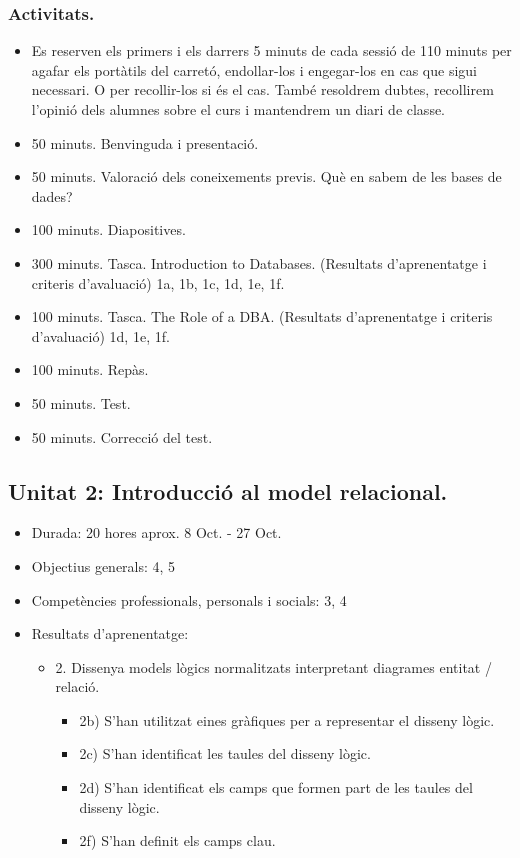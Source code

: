 \documentclass[catalan, a4paper, 12pt, titlepage]{article}
\begin{document}
  \subsubsection{Activitats.}

  \begin{itemize}
          \item Es reserven els primers i els darrers 5 minuts de cada sessió de 110 minuts per agafar els portàtils del carretó, endollar-los i engegar-los en cas que sigui necessari. O per recollir-los si és el cas. També resoldrem dubtes, recollirem l'opinió dels alumnes sobre el curs i mantendrem un diari de classe.
	  \item 50 minuts. Benvinguda i presentació.
	  \item 50 minuts. Valoració dels coneixements previs. Què en sabem de les bases de dades?
	  \item 100 minuts. Diapositives.
	  \item 300 minuts. Tasca. Introduction to Databases.
		  (\faGraduationCap Resultats d'aprenentatge i criteris d'avaluació) 1a, 1b, 1c, 1d, 1e, 1f.
	  \item 100 minuts. Tasca. The Role of a DBA.
		  (\faGraduationCap Resultats d'aprenentatge i criteris d'avaluació) 1d, 1e, 1f.
	  \item 100 minuts. Repàs.
	  \item 50 minuts. Test.
	  \item 50 minuts. Correcció del test.
  \end{itemize}

  \subsection{Unitat 2: Introducció al model relacional.}

  \begin{itemize}
	\item Durada: 20 hores aprox. 8 Oct. - 27 Oct.
	\item Objectius generals: 4, 5
	\item Competències professionals, personals i socials: 3, 4
	\item Resultats d'aprenentatge: 
		\begin{itemize}
			\item 2. Dissenya models lògics normalitzats interpretant diagrames entitat / relació.
				\begin{itemize}
					\item 2b) S'han utilitzat eines gràfiques per a representar el disseny lògic.
					\item 2c) S'han identificat les taules del disseny lògic.
					\item 2d) S'han identificat els camps que formen part de les taules del disseny lògic.
					\item 2f) S'han definit els camps clau.
				\end{itemize}
		\end{itemize}
  \end{itemize}
\end{document}
